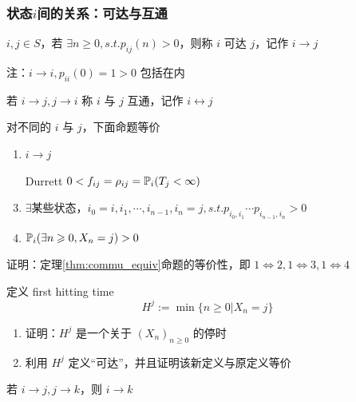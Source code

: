 \subsubsection{状态$i$间的关系：可达与互通}

\begin{definition}[可达]
    $i,j\in S$，若 $\exists n\geq 0, s.t.p_{ij}(n)>0$，则称 $i$ 可达 $j$，记作 $i\to j$

    注：$i\to i,p_{ii}(0)=1>0$ 包括在内
\end{definition}

\begin{definition}[互通]
    若 $i\to j,j\to i$ 称 $i$ 与 $j$ 互通，记作 $i\leftrightarrow j$
\end{definition}

\begin{theorem}\label{thm:commu_equiv}
    对不同的 $i$ 与 $j$，下面命题等价
    \begin{enumerate}
        \item $i\to j$
        \item [Durrett\cite{durrett}] $0<f_{ij}=\rho_{ij}=\mathbb{P}_i(T_j<\infty)$
        \item $\exists$某些状态，$i_0=i,i_1,\cdots,i_{n-1},i_n=j,s.t.p_{i_0,i_1}\cdots p_{i_{n-1},i_n}>0$
        \item $\mathbb{P}_i(\exists n\geqslant 0,X_n=j)>0$
    \end{enumerate}
\end{theorem}

\begin{problem}[作业6-1]
    证明：定理\ref{thm:commu_equiv}命题的等价性，即 $1\Leftrightarrow 2,1\Leftrightarrow 3, 1\Leftrightarrow 4$
\end{problem}

\begin{problem}[作业6-2]
    定义 first hitting time
    \[
    H^j:=\min\{n\geq 0|X_n=j\}
    \]
    \begin{enumerate}
        \item 证明：$H^j$ 是一个关于 $(X_n)_{n\geq 0}$ 的停时
        \item 利用 $H^j$ 定义“可达”，并且证明该新定义与原定义等价
    \end{enumerate}
\end{problem}

\begin{property}
    若 $i\to j,j\to k$，则 $i\to k$
\end{property}


